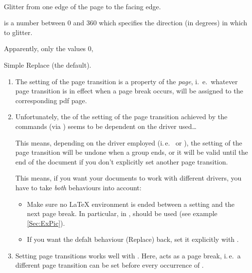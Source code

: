 \begin{description}
    \newslide
    
  \item[{\present[h]{\commandapp{pageTransitionGlitter}{\carg{angle}}}}]\mbox{}\\
    Glitter from one edge of the page to the facing edge.
    
    \stepwise
    {%
       is a number between $0$ and $360$ which specifies the direction (in degrees) in which to glitter.
    
      Apparently, only the values $0$,
      }%
    \pause

  \item[{\present[h]{\macroname{pageTransitionReplace}}}] Simple Replace (the default). 
  \end{description}

  \pageTransitionReplace

  \newslide

  \begin{enumerate}
  \item The setting of the page transition is a property of the \emph{page}, i.~e.\ whatever page transition is in
    effect when a page break occurs, will be assigned to the corresponding pdf page.
    
  \item Unfortunately, the  of the setting of the page transition achieved by the
     commands (via ) seems to be dependent on the driver used\dots
    
    This means, depending on the driver employed (i.\,e.\  or ), the setting of the page
    transition will be undone when a group ends, or it will be valid until the end of the document if you don't
    explicitly set another page transition.
    
    This means, if you want your documents to work with different drivers, you have to take \emph{both} behaviours into
    account:
    \begin{itemize}
    \item Make sure no \LaTeX{} environment is ended between a  setting and the next page
      break. In particular, in ,  should be used (see example \ref{Sec:ExPic}).
    \item If you want the defalt behaviour (Replace) back, set it explicitly with .
    \end{itemize}

  \item Setting page transitions works well with . Here,  acts as a page break,
    i.\,e.\ a different page transition can be set before every occurrence of .
  \end{enumerate}
  
